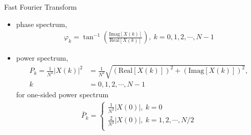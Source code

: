 \documentclass[pdflatex,compress,mathserif]{beamer}
\begin{document}
\begin{frame}{Fast Fourier Transform}
	\begin{itemize}
		\item phase spectrum,
		\begin{align*}
			\varphi_k = \tan^{-1}\left(\frac{\text{Imag}[X(k)]}{\text{Real}[X(k)]}\right),~k=0,1,2,\cdots,N-1
		\end{align*}
		\item power spectrum,
		\begin{align*}
			P_k = \frac{1}{N^2}|X(k)|^2 &= \frac{1}{N^2}\sqrt{(\text{Real}[X(k)])^2 + (\text{Imag}[X(k)])^2},\\
			k&=0,1,2,\cdots,N-1
		\end{align*}
		for one-sided power spectrum
		\begin{align*}
			\bar{P}_k = \begin{cases}
				\frac{1}{N^2}|X(0)|,~k=0 \\
				\frac{2}{N^2}|X(0)|,~k=1,2,\cdots,N/2 \\
			\end{cases}
		\end{align*}
	\end{itemize}
\end{frame}
\end{document}
